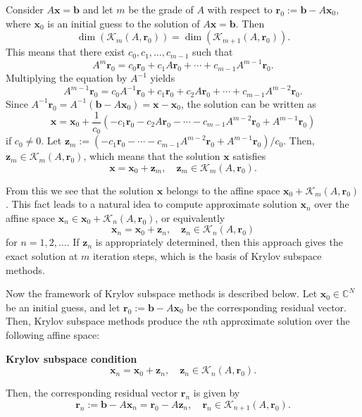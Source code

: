 Consider $A\bm x=\bm b$ and let $m$ be the grade of $A$ with respect to $\bm r_0:=\bm b-A\bm x_0$, where $\bm x_0$ is an initial guess to the solution of $A\bm x=\bm b$. Then
\[
\dim(\mathcal K_m(A,\bm r_0))=\dim(\mathcal K_{m+1}(A,\bm r_0)).
\]
This means that there exist $c_0,c_1,\ldots,c_{m-1}$ such that
\[
A^m\bm r_0=c_0\bm r_0+c_1A\bm r_0+\cdots+c_{m-1}A^{m-1}\bm r_0.
\]
Multiplying the equation by $A^{-1}$ yields
\[
A^{m-1}\bm r_0=c_0A^{-1}\bm r_0+c_1\bm r_0+c_2A\bm r_0+\cdots+c_{m-1}A^{m-2}\bm r_0.
\]
Since $A^{-1}\bm r_0=A^{-1}(\bm b-A\bm x_0)=\bm x-\bm x_0$, the solution can be written as
\[
\bm x=\bm x_0+\frac{1}{c_0}(-c_1\bm r_0-c_2A\bm r_0-\cdots-c_{m-1}A^{m-2}\bm r_0+A^{m-1}\bm r_0)
\]
if $c_0\ne0$. Let $\bm z_m:=(-c_1\bm r_0-\cdots-c_{m-1}A^{m-2}\bm r_0+A^{m-1}\bm r_0)/c_0$. Then, $\bm z_m\in\mathcal K_m(A,\bm r_0)$, which means that the solution $\bm x$ satisfies
\[
\bm x=\bm x_0+\bm z_m,\quad\bm z_m\in\mathcal K_m(A,\bm r_0).
\]

From this we see that the solution $\bm x$ belongs to the affine space $\bm x_0+\mathcal K_m(A,\bm r_0)$. This fact leads to a natural idea to compute approximate solution $\bm x_n$ over the affine space $\bm x_n\in\bm x_0+\mathcal K_n(A,\bm r_0)$, or equivalently
\[
\bm x_n=\bm x_0+\bm z_n,\quad\bm z_n\in\mathcal K_n(A,\bm r_0)
\]
for $n=1,2,\ldots$. If $\bm z_n$ is appropriately determined, then this approach gives the exact solution at $m$ iteration steps, which is the basis of Krylov subspace methods.

Now the framework of Krylov subspace methods is described below. Let $\bm x_0\in\mathbb C^N$ be an initial guess, and let $\bm r_0:=\bm b-A\bm x_0$ be the corresponding residual vector. Then, Krylov subspace methods produce the $n$th approximate solution over the following affine space:

\noindent\textbf{Krylov subspace condition}
\begin{equation}\label{eq:krylov-iterate-condition}
\bm x_n=\bm x_0+\bm z_n,\quad\bm z_n\in\mathcal K_n(A,\bm r_0).
\end{equation}

Then, the corresponding residual vector $\bm r_n$ is given by
\begin{equation}\label{eq:krylov-residual}
\bm r_n:=\bm b-A\bm x_n=\bm r_0-A\bm z_n,\quad\bm r_n\in\mathcal K_{n+1}(A,\bm r_0).
\end{equation}

